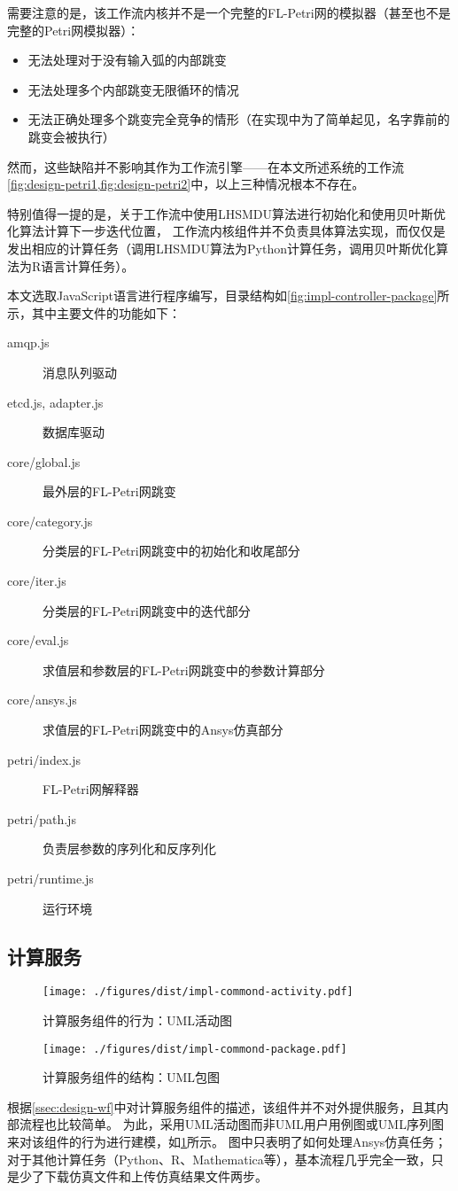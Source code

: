 \documentclass[index]{subfiles}
\begin{document}
需要注意的是，该工作流内核并不是一个完整的FL-Petri网的模拟器（甚至也不是完整的Petri网模拟器）：
\begin{itemize}
  \item 无法处理对于没有输入弧的内部跳变
  \item 无法处理多个内部跳变无限循环的情况
  \item 无法正确处理多个跳变完全竞争的情形（在实现中为了简单起见，名字靠前的跳变会被执行）
\end{itemize}
然而，这些缺陷并不影响其作为工作流引擎——在本文所述系统的工作流\cref{fig:design-petri1,fig:design-petri2}中，以上三种情况根本不存在。

特别值得一提的是，关于工作流中使用LHSMDU算法进行初始化和使用贝叶斯优化算法计算下一步迭代位置，
工作流内核组件并不负责具体算法实现，而仅仅是发出相应的计算任务（调用LHSMDU算法为Python计算任务，调用贝叶斯优化算法为R语言计算任务）。

本文选取JavaScript语言进行程序编写，目录结构如\cref{fig:impl-controller-package}所示，其中主要文件的功能如下：
\begin{description}
  \item[amqp.js] 消息队列驱动
  \item[etcd.js, adapter.js] 数据库驱动
  \item[core/global.js] 最外层的FL-Petri网跳变
  \item[core/category.js] 分类层的FL-Petri网跳变中的初始化和收尾部分
  \item[core/iter.js] 分类层的FL-Petri网跳变中的迭代部分
  \item[core/eval.js] 求值层和参数层的FL-Petri网跳变中的参数计算部分
  \item[core/ansys.js] 求值层的FL-Petri网跳变中的Ansys仿真部分
  \item[petri/index.js] FL-Petri网解释器
  \item[petri/path.js] 负责层参数的序列化和反序列化
  \item[petri/runtime.js] 运行环境
\end{description}

\subsection{计算服务}
\begin{figure}[h]
  \centering
  \texttt{[image: ./figures/dist/impl-commond-activity.pdf]}
  \caption{计算服务组件的行为：UML活动图\label{fig:impl-commond-activity}}
\end{figure}
\begin{figure}[h]
  \centering
  \texttt{[image: ./figures/dist/impl-commond-package.pdf]}
  \caption{计算服务组件的结构：UML包图\label{fig:impl-commond-package}}
\end{figure}
根据\cref{ssec:design-wf}中对计算服务组件的描述，该组件并不对外提供服务，且其内部流程也比较简单。
为此，采用UML活动图而非UML用户用例图或UML序列图来对该组件的行为进行建模，如\cref{fig:impl-commond-activity}所示。
图中只表明了如何处理Ansys仿真任务；
对于其他计算任务（Python、R、Mathematica等），基本流程几乎完全一致，只是少了下载仿真文件和上传仿真结果文件两步。
\end{document}
